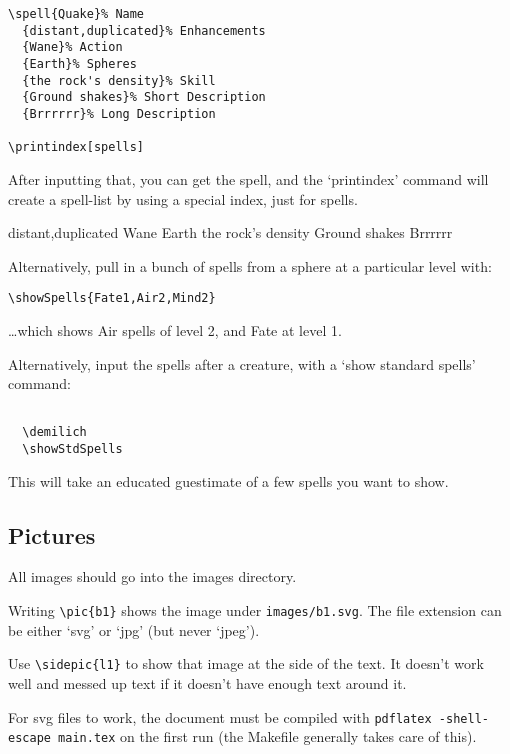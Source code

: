 \documentclass[a4paper,openany]{book}
\begin{document}
\begin{multicols}{2}
\begin{verbatim}
\spell{Quake}% Name
  {distant,duplicated}% Enhancements
  {Wane}% Action
  {Earth}% Spheres
  {the rock's density}% Skill
  {Ground shakes}% Short Description
  {Brrrrrr}% Long Description

\printindex[spells]
\end{verbatim}

After inputting that, you can get the spell, and the `printindex' command will create a spell-list by using a special index, just for spells.

  {distant,duplicated}%
  {Wane}%
  {Earth}%
  {the rock's density}%
  {Ground shakes}%
  {Brrrrrr}%

Alternatively, pull in a bunch of spells from a sphere at a particular level with:

\verb"\showSpells{Fate1,Air2,Mind2}"


\ldots which shows Air spells of level 2, and Fate at level 1.

Alternatively, input the spells after a creature, with a `show standard spells' command:

\begin{verbatim}

  \demilich
  \showStdSpells

\end{verbatim}

This will take an educated guestimate of a few spells you want to show.

\demilich

\showStdSpells

\subsection{Pictures}


All images should go into the images directory.

Writing \verb"\pic{b1}" shows the image under \verb"images/b1.svg".
The file extension can be either `svg' or `jpg' (but never `jpeg').

Use \verb"\sidepic{l1}" to show that image at the side of the text.
It doesn't work well and messed up text if it doesn't have enough text around it.


For svg files to work, the document must be compiled with \verb"pdflatex -shell-escape main.tex" on the first run (the Makefile generally takes care of this).


\end{multicols}
\end{document}
